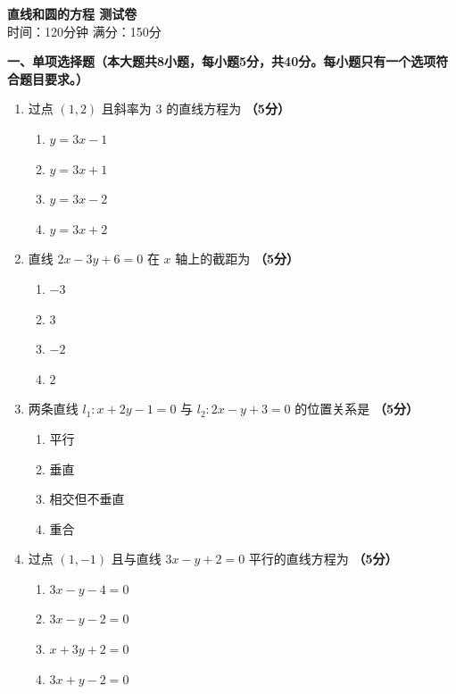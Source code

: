 \documentclass[12pt, a4paper]{ctexart}
\newcommand{\score}[1]{\hfill\textbf{（#1分）}}
\begin{document}
\begin{center}
{\Large\bfseries 直线和圆的方程 测试卷}\\[0.5em]
{\normalsize 时间：120分钟 \quad 满分：150分}
\end{center}

\vspace{1em}

\noindent\textbf{一、单项选择题（本大题共8小题，每小题5分，共40分。每小题只有一个选项符合题目要求。）}

\vspace{0.5em}

\begin{enumerate}
\item 过点 $(1,2)$ 且斜率为 $3$ 的直线方程为 \score{5}
\begin{enumerate}[label=\Alph*.]
\item $y=3x-1$
\item $y=3x+1$
\item $y=3x-2$
\item $y=3x+2$
\end{enumerate}

\item 直线 $2x-3y+6=0$ 在 $x$ 轴上的截距为 \score{5}
\begin{enumerate}[label=\Alph*.]
\item $-3$
\item $3$
\item $-2$
\item $2$
\end{enumerate}

\item 两条直线 $l_1: x+2y-1=0$ 与 $l_2: 2x-y+3=0$ 的位置关系是 \score{5}
\begin{enumerate}[label=\Alph*.]
\item 平行
\item 垂直
\item 相交但不垂直
\item 重合
\end{enumerate}

\item 过点 $(1,-1)$ 且与直线 $3x-y+2=0$ 平行的直线方程为 \score{5}
\begin{enumerate}[label=\Alph*.]
\item $3x-y-4=0$
\item $3x-y-2=0$
\item $x+3y+2=0$
\item $3x+y-2=0$
\end{enumerate}


\end{enumerate}
\end{document}
